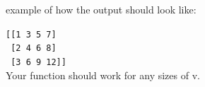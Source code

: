 example of how the output should look like:



\verb![[1 3 5 7]!\\

\verb! [2 4 6 8]!\\

\verb! [3 6 9 12]]!\\



Your function should work for any sizes of v.

